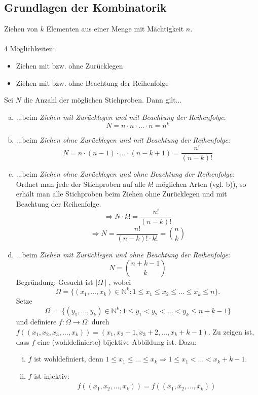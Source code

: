 \documentclass[a4paper,12pt,fleqn]{scrartcl}
\newcommand{\N}{\mathbb{N}}
\newcommand{\impl}{\Rightarrow}
\theoremstyle{definition}
\theoremstyle{plain}
\theoremstyle{remark}
\begin{document}
\subsection{Grundlagen der Kombinatorik}
Ziehen von $k$ Elementen aus einer Menge mit Mächtigkeit $n$.\\
\\
4 Möglichkeiten:
\begin{itemize}
\item Ziehen mit bzw. ohne Zurücklegen
\item Ziehen mit bzw. ohne Beachtung der Reihenfolge
\end{itemize}
Sei $N$ die Anzahl der möglichen Stichproben. Dann gilt...
\begin{enumerate}[a)]
\item ...beim \emph{Ziehen mit Zurücklegen und mit Beachtung der Reihenfolge}:
\[N = n \cdot n \cdot \ldots \cdot n = n^{k}\]
\item ...beim \emph{Ziehen ohne Zurücklegen und mit Beachtung der Reihenfolge}:
\[N = n \cdot (n-1) \cdot \ldots \cdot (n-k+1) = \frac{n!}{(n-k)!}\]
\item ...beim \emph{Ziehen ohne Zurücklegen und ohne Beachtung der Reihenfolge}:\\
Ordnet man jede der Stichproben auf alle $k!$ möglichen Arten (vgl. b)), so erhält man alle Stichproben beim Ziehen ohne Zurücklegen und mit Beachtung der Reihenfolge.
\[\impl N \cdot k! = \frac{n!}{(n-k)!}\]
\[\impl N = \frac{n!}{(n-k)! \cdot k!} = \binom{n}{k}\]
\item ...beim \emph{Ziehen mit Zurücklegen und ohne Beachtung der Reihenfolge}:
\[N = \binom{n+k-1}{k}\]
Begründung: Gesucht ist $\mid \Omega \mid$, wobei 
\[\Omega=\{(x_1, \ldots, x_k) \in \N^{k}:1 \leq x_1 \leq x_2 \leq \ldots \leq x_k \leq n\}.\]
Setze \[\Omega^\prime=\{(y_1, \ldots, y_k) \in \N^{k}:1 \leq y_1 < y_2 < \ldots < y_k \leq n+k-1\}\] und definiere $f: \Omega \rightarrow \Omega^\prime$ durch $f((x_1, x_2, x_3, \ldots, x_k)) = (x_1, x_2+1, x_3+2, \ldots, x_k+k-1)$. Zu zeigen ist, dass $f$ eine (wohldefinierte) bijektive Abbildung ist. Dazu:
\begin{enumerate}[(i)]
\item $f$ ist wohldefiniert, denn $1 \leq x_1 \leq \ldots \leq x_k \impl 1 \leq x_1 < \ldots < x_k+k-1$.
\item $f$ ist injektiv:
\begin{align*}
&f((x_1, x_2, \ldots, x_k)) = f((\widetilde{x_1}, \widetilde{x_2}, \ldots, \widetilde{x_k})) \\

\end{align*}
\end{enumerate}
\end{enumerate}
\end{document}
